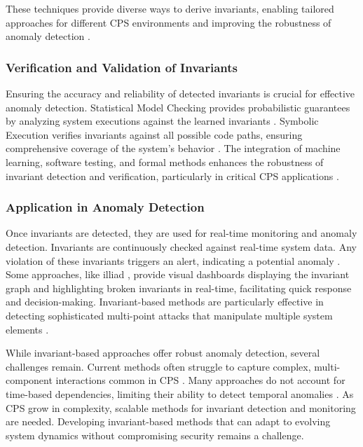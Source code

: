 These techniques provide diverse ways to derive invariants, enabling tailored approaches for different CPS environments and improving the robustness of anomaly detection \cite{206}.




\subsubsection{Verification and Validation of Invariants}

Ensuring the accuracy and reliability of detected invariants is crucial for effective anomaly detection. Statistical Model Checking provides probabilistic guarantees by analyzing system executions against the learned invariants \cite{24}. Symbolic Execution verifies invariants against all possible code paths, ensuring comprehensive coverage of the system's behavior \cite{24}. The integration of machine learning, software testing, and formal methods enhances the robustness of invariant detection and verification, particularly in critical CPS applications \cite{24}.

\subsubsection{Application in Anomaly Detection}

Once invariants are detected, they are used for real-time monitoring and anomaly detection. Invariants are continuously checked against real-time system data. Any violation of these invariants triggers an alert, indicating a potential anomaly \cite{26}\cite{28}. Some approaches, like illiad \cite{23}, provide visual dashboards displaying the invariant graph and highlighting broken invariants in real-time, facilitating quick response and decision-making. Invariant-based methods are particularly effective in detecting sophisticated multi-point attacks that manipulate multiple system elements \cite{26}.



While invariant-based approaches offer robust anomaly detection, several challenges remain. Current methods often struggle to capture complex, multi-component interactions common in CPS \cite{25}. Many approaches do not account for time-based dependencies, limiting their ability to detect temporal anomalies \cite{25}. As CPS grow in complexity, scalable methods for invariant detection and monitoring are needed. Developing invariant-based methods that can adapt to evolving system dynamics without compromising security remains a challenge.

